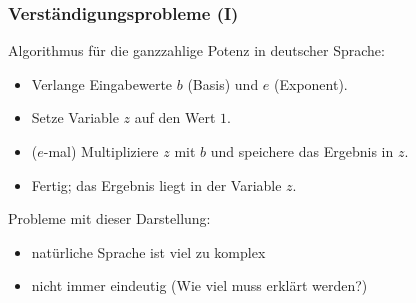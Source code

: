     \begin{frame}
        \frametitle{Verständigungsprobleme (I)}
        Algorithmus für die ganzzahlige Potenz in deutscher Sprache:
        \begin{itemize}
            \item Verlange Eingabewerte $b$ (Basis) und $e$ (Exponent).
            \pause
            \item Setze Variable $z$ auf den Wert $1$.
            \pause
            \item ($e$-mal) Multipliziere $z$ mit $b$ und speichere das Ergebnis
            in $z$.
            \pause
            \item Fertig; das Ergebnis liegt in der Variable $z$.
        \end{itemize}
        \pause Probleme mit dieser Darstellung:
        \begin{itemize}
            \item natürliche Sprache ist viel zu komplex
            \item nicht immer eindeutig (Wie viel muss erklärt werden?)
        \end{itemize}
    \end{frame}


